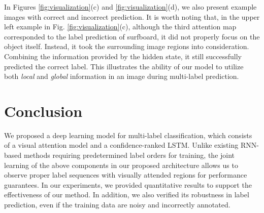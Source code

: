 \documentclass[letterpaper]{article} %
\begin{document}
In Figures \ref{fig:visualization}(c) and \ref{fig:visualization}(d), we also present example images with correct and incorrect prediction. It is worth noting that, in the upper left example in Fig. \ref{fig:visualization}(c), although the third attention map corresponded to the label prediction of surfboard, it did not properly focus on the object itself. Instead, it took the surrounding image regions into consideration. Combining the information provided by the hidden state, it still successfully predicted the correct label. This illustrates the ability of our model to utilize both \emph{local} and \emph{global} information in an image during multi-label prediction.

\section{Conclusion}
We proposed a deep learning model for multi-label classification, which consists of a visual attention model and a confidence-ranked LSTM. Unlike existing RNN-based methods requiring predetermined label orders for training, the joint learning of the above components in our proposed architecture allows us to observe proper label sequences with visually attended regions for performance guarantees. In our experiments, we provided quantitative results to support the effectiveness of our method. In addition, we also verified its robustness in label prediction, even if the training data are noisy and incorrectly annotated.
\end{document}
